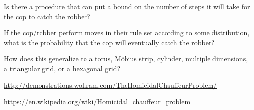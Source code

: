 \documentclass{article}
\begin{document}
\begin{related}
  \item Is there a procedure that can put a bound on the number of steps it will
    take for the cop to catch the robber?
  \item If the cop/robber perform moves in their rule set according to some
    distribution, what is the probability that the cop will eventually catch the
    robber?
  \item How does this generalize to a torus, M\"obius strip, cylinder, multiple
    dimensions, a triangular grid, or a hexagonal grid?
\end{related}
\begin{references}
  \item \url{http://demonstrations.wolfram.com/TheHomicidalChauffeurProblem/}
  \item \url{https://en.wikipedia.org/wiki/Homicidal_chauffeur_problem}
\end{references}
\end{document}
